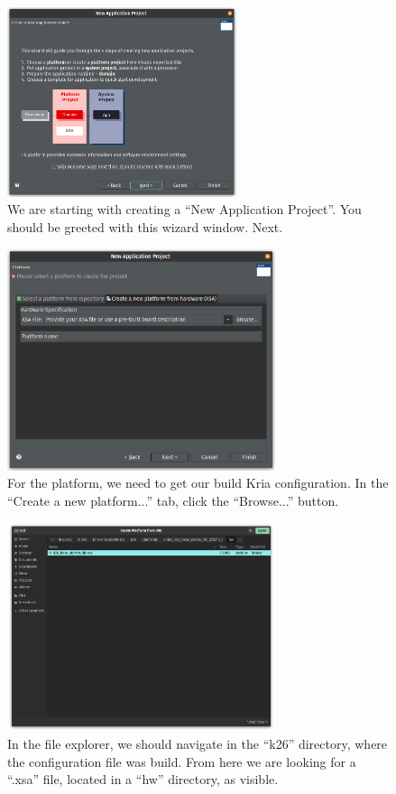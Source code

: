 \documentclass[10pt]{article}
\begin{document}
\begin{figure}[H]
  \centering
  \includegraphics[width=0.6\textwidth]{./img/vitis_new/project1}
  \caption{We are starting with creating a ``New Application Project''. You should be greeted with this wizard window. Next.}
  \label{fig:project1}
\end{figure}

\begin{figure}[H]
  \centering
  \includegraphics[width=0.7\textwidth]{./img/vitis_new/project2}
  \caption{For the platform, we need to get our build Kria configuration. In the ``Create a new platform...'' tab, click the ``Browse...'' button.}
  \label{fig:project2}
\end{figure}

\begin{figure}[H]
  \centering
  \includegraphics[width=0.7\textwidth]{./img/vitis_new/project3}
  \caption{In the file explorer, we should navigate in the ``k26'' directory, where the configuration file was build.
    From here we are looking for a ``.xsa'' file, located in a ``hw'' directory, as visible.}
  \label{fig:project3}
\end{figure}
\end{document}
